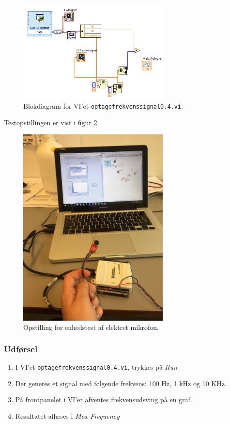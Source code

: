 		\begin{figure}
			\centering
			\includegraphics[width=3in]{optagefrekvenssignal04}
			\caption{Blokdiagram for VI'et \texttt{optagefrekvenssignal0.4.vi}.}
			\label{fig:webvi}
		\end{figure}
		
		Testopstillingen er vist i figur \ref{fig:webop}.\\
		
		\begin{figure}
			\centering
			\includegraphics[width=3in]{webcamop.jpg}
			\caption{Opstilling for enhedstest af elektret mikrofon.}
			\label{fig:webop}
		\end{figure}
	
		\subsubsection{Udførsel}
			\begin{enumerate}
				\item I VI'et \texttt{optagefrekvenssignal0.4.vi}, trykkes på \textit{Run}.  
				\item Der generes et signal med følgende frekvens: 100 Hz, 1 kHz og 10 KHz. 
				\item På frontpanelet i VI'et afventes frekvensudsving på en graf.  
				\item Resultatet aflæses i \textit{Max Frequency}
			\end{enumerate}
			
